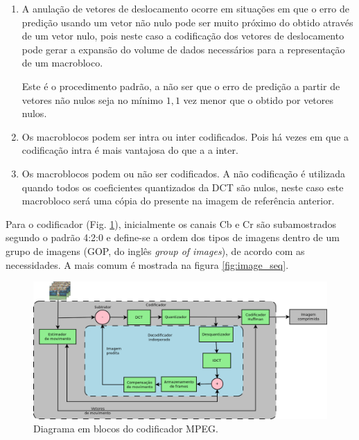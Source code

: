 \begin{enumerate}
\item A anulação de vetores de deslocamento ocorre em situações em que o erro de predição usando um vetor não nulo pode ser muito próximo do obtido através de um vetor nulo, pois neste caso a codificação dos vetores de deslocamento pode gerar a expansão do volume de dados necessários para a representação de um macrobloco.

Este é o procedimento padrão, a não ser que o erro de predição a partir de vetores não nulos seja no mínimo $ 1,1 $ vez menor que o obtido por vetores nulos.

\item Os macroblocos podem ser intra ou inter codificados. Pois há vezes em que a codificação intra é mais vantajosa do que a a inter.

\item Os macroblocos podem ou não ser codificados. A não codificação é utilizada quando todos os coeficientes quantizados da DCT são nulos, neste caso este macrobloco será uma cópia do presente na imagem de referência anterior.
\end{enumerate}

Para o codificador (Fig. \ref{fig:mpeg_enc}), inicialmente os canais Cb e Cr são subamostrados segundo o padrão 4:2:0 e define-se a ordem dos tipos de imagens dentro de um grupo de imagens (GOP, do inglês \textit{group of images}), de acordo com as necessidades. A mais comum é mostrada na figura \ref{fig:image_seq}.

\begin{figure}[!ht]
\begin{center}
\includegraphics[scale=0.4]{./Figures/png/mpeg_encoder.png}
\caption{Diagrama em blocos do codificador MPEG.}
\label{fig:mpeg_enc}
\end{center}
\end{figure}

